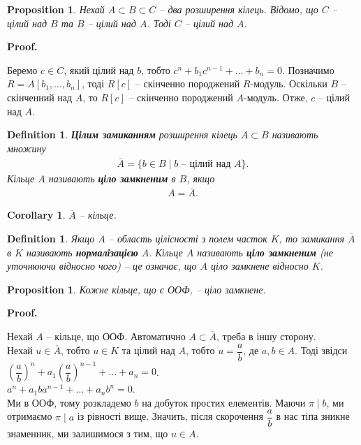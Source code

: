 \documentclass[a4paper, 10pt]{article}
\makeatletter
\theoremstyle{theoremdd}
\theoremstyle{theoremdd}
\newtheorem{definition}[theorem]{Definition}
\theoremstyle{theoremdd}
\theoremstyle{theoremdd}
\theoremstyle{theoremdd}
\theoremstyle{theoremdd}
\theoremstyle{theoremdd}
\theoremstyle{theoremdd}
\theoremstyle{theoremdd}
\newtheorem{proposition}[theorem]{Proposition}
\theoremstyle{theoremdd}
\theoremstyle{theoremdd}
\theoremstyle{theoremdd}
\theoremstyle{theoremdd}
\theoremstyle{theoremdd}
\newtheorem{corollary}[theorem]{Corollary}
\theoremstyle{theoremdd}
\renewenvironment{proof}[1][Proof.\\]{\par
\pushQED{\hfill \qed}%
\normalfont \topsep6\p@\@plus6\p@\relax
\trivlist
\item\relax
{\bfseries
#1\@addpunct{.}}\hspace\labelsep\ignorespaces
}{%
\popQED\endtrivlist\@endpefalse
}
\makeatother
\begin{document}
\begin{proposition}
Нехай $A \subset B \subset C$ -- два розширення кілець. Відомо, що $C$ -- цілий над $B$ та $B$ -- цілий над $A$. Тоді $C$ -- цілий над $A$.
\end{proposition}

\begin{proof}
Беремо $c \in C$, який цілий над $b$, тобто $c^n + b_1 c^{n-1} + \dots + b_n = 0$. Позначимо $R = A[b_1,\dots,b_n]$, тоді $R[c]$ -- скінченно породжений $R$-модуль. Оскільки $B$ -- скінченний над $A$, то $R[c]$ -- скінченно породжений $A$-модуль. Отже, $c$ -- цілий над $A$.
\end{proof}

\begin{definition}
\textbf{Цілим замиканням} розширення кілець $A \subset B$ називають множину
\begin{align*}
\overline{A} = \{b \in B \mid b \text{ -- цілий над $A$} \}.
\end{align*}
Кільце $A$ називають \textbf{ціло замкненим} в $B$, якщо
\begin{align*}
A = \overline{A}.
\end{align*}
\end{definition}

\begin{corollary}
$\overline{A}$ -- кільце.
\end{corollary}

\begin{definition}
Якщо $A$ -- область цілісності з полем часток $K$, то замикання $\overline{A}$ в $K$ називають \textbf{нормалізацією} $A$. Кільце $A$ називають \textbf{ціло замкненим} (не уточнюючи відносно чого) -- це означає, що $A$ ціло замкнене відносно $K$.
\end{definition}

\begin{proposition}
Кожне кільце, що є ООФ, -- ціло замкнене.
\end{proposition}

\begin{proof}
Нехай $A$ -- кільце, що ООФ. Автоматично $A \subset \overline{A}$, треба в іншу сторону.\\
Нехай $u \in \overline{A}$, тобто $u \in K$ та цілий над $A$, тобто $u = \dfrac{a}{b}$, де $a,b \in A$. Тоді звідси\\
$\left(\dfrac{a}{b}\right)^n + a_1 \left( \dfrac{a}{b}\right)^{n-1} + \dots + a_n = 0$.\\
$a^n + a_1 b a^{n-1} + \dots + a_n b^n = 0$.\\
Ми в ООФ, тому розкладемо $b$ на добуток простих елементів. Маючи $\pi \mid b$, ми отримаємо $\pi \mid a$ із рівності вище. Значить, після скорочення $\dfrac{a}{b}$ в нас тіпа зникне знаменник, ми залишимося з тим, що $u \in A$.
\end{proof}
\end{document}
